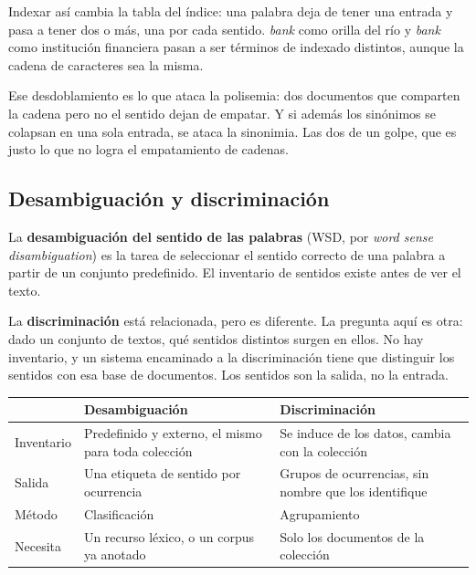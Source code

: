 \documentclass[11pt,letterpaper]{article}
\begin{document}
Indexar así cambia la tabla del índice: una palabra deja de tener una
entrada y pasa a tener dos o más, una por cada sentido.
\textit{bank} como orilla del río y \textit{bank} como institución
financiera pasan a ser términos de indexado distintos, aunque la
cadena de caracteres sea la misma.

\begin{idea}
    Ese desdoblamiento es lo que ataca la polisemia: dos documentos
    que comparten la cadena pero no el sentido dejan de empatar. Y si
    además los sinónimos se colapsan en una sola entrada, se ataca la
    sinonimia. Las dos de un golpe, que es justo lo que no logra el
    empatamiento de cadenas.
\end{idea}

\subsection*{Desambiguación y discriminación}

La \textbf{desambiguación del sentido de las palabras} (WSD, por
\textit{word sense disambiguation}) es la tarea de seleccionar el
sentido correcto de una palabra a partir de un conjunto predefinido.
El inventario de sentidos existe antes de ver el texto.

La \textbf{discriminación} está relacionada, pero es diferente. La
pregunta aquí es otra: dado un conjunto de textos, qué sentidos
distintos surgen en ellos. No hay inventario, y un sistema encaminado
a la discriminación tiene que distinguir los sentidos con esa base de
documentos. Los sentidos son la salida, no la entrada.

\begin{center}
\begin{tabular}{>{\raggedright\arraybackslash}p{2.3cm}
                >{\raggedright\arraybackslash}p{5.4cm}
                >{\raggedright\arraybackslash}p{5.4cm}}
    \toprule
    & \textbf{Desambiguación} & \textbf{Discriminación} \\
    \midrule
    Inventario &
    Predefinido y externo, el mismo para toda colección &
    Se induce de los datos, cambia con la colección \\
    \addlinespace
    Salida &
    Una etiqueta de sentido por ocurrencia &
    Grupos de ocurrencias, sin nombre que los identifique \\
    \addlinespace
    Método &
    Clasificación &
    Agrupamiento \\
    \addlinespace
    Necesita &
    Un recurso léxico, o un corpus ya anotado &
    Solo los documentos de la colección \\
    \bottomrule
\end{tabular}
\end{center}
\end{document}
